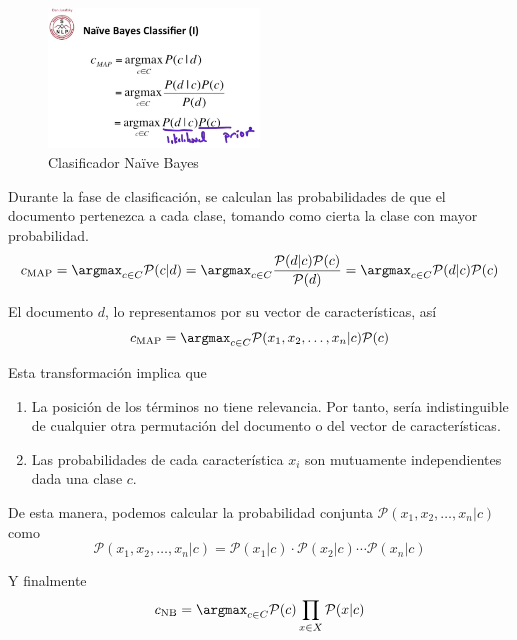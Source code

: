 \begin{figure}[htbp]
\centering
\includegraphics[width=0.5\textwidth]{multinomialNB-clsfy}
\caption[Clasificador Naïve Bayes]{Clasificador Naïve Bayes \citep{Jurafsky2015}}
\label{fig:multinomialNB-clsfy}
\end{figure}

Durante la fase de clasificación, se calculan las probabilidades de que el documento pertenezca a cada clase, tomando como cierta la clase con mayor probabilidad.
\begin{equation}
c_\text{MAP} = \argmax_{c\in C} \mathcal{P}(c|d) 
= \argmax_{c\in C} \frac{\mathcal{P}(d|c)\mathcal{P}(c)}{\mathcal{P}(d)}
= \argmax_{c\in C} \mathcal{P}(d|c)\mathcal{P}(c)
\end{equation}

El documento $d$, lo representamos por su vector de características, así
\begin{equation}
c_\text{MAP} = \argmax_{c\in C} \mathcal{P}(x_1,x_2,\ldots,x_n|c)\mathcal{P}(c)
\end{equation}

Esta transformación implica que
\begin{enumerate}
\item La posición de los términos no tiene relevancia. Por tanto, sería indistinguible de cualquier otra permutación del documento o del vector de características. 
\item Las probabilidades de cada característica $x_i$ son mutuamente independientes dada una clase $c$.
\end{enumerate}

De esta manera, podemos calcular la probabilidad conjunta $\mathcal{P}(x_1,x_2,\ldots,x_n|c)$ como
\begin{equation}
\mathcal{P}(x_1,x_2,\ldots,x_n|c) = \mathcal{P}(x_1|c) \cdot \mathcal{P}(x_2|c) \cdots \mathcal{P}(x_n|c)
\end{equation}

Y finalmente
\begin{equation}
c_\text{NB} = \argmax_{c\in C} \mathcal{P}(c) \prod_{x\in X} \mathcal{P}(x|c)
\end{equation}

